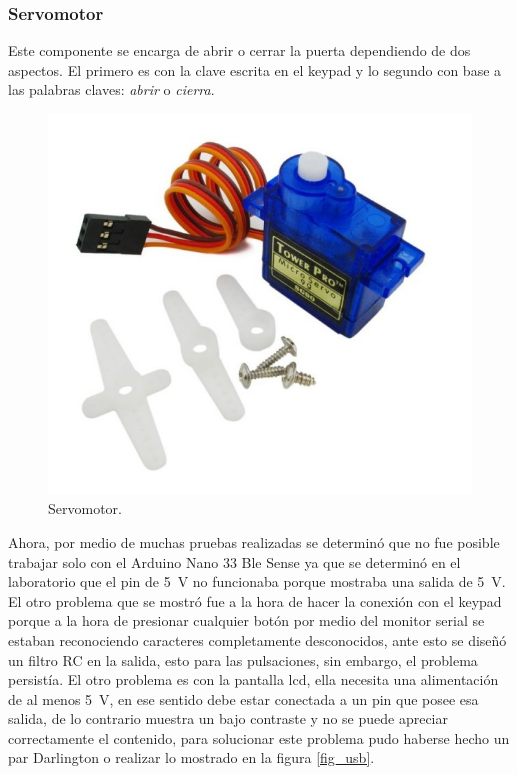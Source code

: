 \subsubsection*{Servomotor}
Este componente se encarga de abrir o cerrar la puerta dependiendo de dos aspectos. El primero es con la clave escrita en el keypad y lo segundo con base a las palabras claves: \textit{abrir} o \textit{cierra}.
\begin{figure}[H]
    \centering
    \includegraphics[width=.4\linewidth]{Img/servo.jpg}
    \caption{Servomotor.}
    \label{fig_servo}
\end{figure}
Ahora, por medio de muchas pruebas realizadas se determinó que no fue posible trabajar solo con el Arduino Nano 33 Ble Sense ya que se determinó en el laboratorio que el pin de \SI{5}{\volt} no funcionaba porque mostraba una salida de \SI{5}{\volt}. El otro problema que se mostró fue a la hora de hacer la conexión con el keypad porque a la hora de presionar cualquier botón por medio del monitor serial se estaban reconociendo caracteres completamente desconocidos, ante esto se diseñó un filtro RC en la salida, esto para las pulsaciones, sin embargo, el problema persistía. El otro problema es con la pantalla lcd, ella necesita una alimentación de al menos \SI{5}{\volt}, en ese sentido debe estar conectada a un pin que posee esa salida, de lo contrario muestra un bajo contraste y no se puede apreciar correctamente el contenido, para solucionar este problema pudo haberse hecho un par Darlington o realizar lo mostrado en la figura \ref{fig_usb}.

